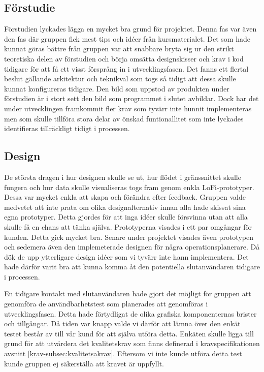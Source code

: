 \subsection{Förstudie}
Förstudien lyckades lägga en mycket bra grund för projektet. Denna fas var även den fas där gruppen fick mest tips och idéer från kursmaterialet. Det som hade kunnat göras bättre från gruppen var att snabbare bryta sig ur den strikt teoretiska delen av förstudien och börja omsätta designskisser och krav i kod tidigare för att få ett visst försprång in i utvecklingsfasen. Det fanns ett flertal beslut gällande arkitektur och teknikval som togs så tidigt att dessa skulle kunnat konfigureras tidigare. Den bild som uppstod av produkten under förstudien är i stort sett den bild som programmet i slutet avbildar. Dock har det under utvecklingen framkommit fler krav som tyvärr inte hunnit implementeras men som skulle tillföra stora delar av önskad funtionallitet som inte lyckades identifieras tillräckligt tidigt i processen.

\subsection{Design}
De största dragen i hur designen skulle se ut, hur flödet i gränssnittet skulle fungera och hur data skulle visualiseras togs fram genom enkla LoFi-prototyper. Dessa var mycket enkla att skapa och förändra efter feedback. Gruppen valde medvetet att inte prata om olika designalternativ innan alla hade skissat sina egna prototyper. Detta gjordes för att inga idéer skulle försvinna utan att alla skulle få en chans att tänka själva. Prototyperna visades i ett par omgångar för kunden. Detta gick mycket bra. Senare under projektet visades även prototypen och sedemera även den implemeterade designen för några operationsplanerare. Då dök de upp ytterligare design idéer som vi tyvärr inte hann implementera. Det hade därför varit bra att kunna komma åt den potentiella slutanvändaren tidigare i processen.

En tidigare kontakt med slutanvändaren hade gjort det möjligt för gruppen att genomföra de användbarhetstest som planerades att genomföras i utvecklingsfasen. Detta hade förtydligat de olika grafiska komponenternas brister och tillgångar. Då tiden var knapp valde vi därför att lämna över den enkät testet består av till vår kund för att själva utföra detta. Enkäten skulle ligga till grund för att utvärdera det kvalitetskrav som finns definerad i kravspecifikationen avsnitt \ref{krav-subsec:kvalitetsakrav}. Eftersom vi inte kunde utföra detta test kunde gruppen ej säkerställa att kravet är uppfyllt.

